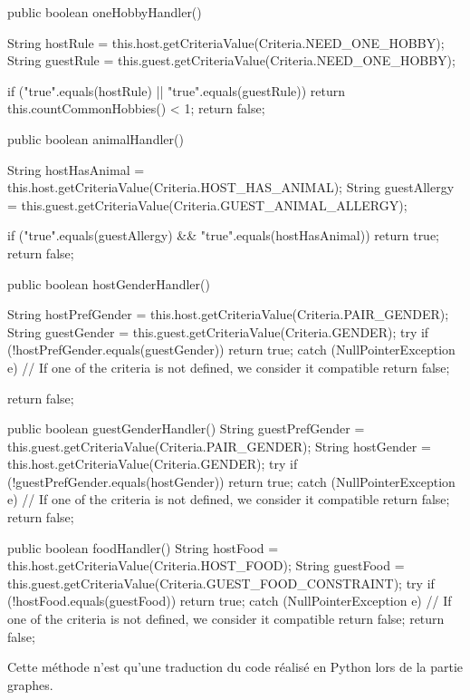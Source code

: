 \documentclass{mytex}
\begin{document}

\begin{codebox}
public boolean oneHobbyHandler() {
	String hostRule = this.host.getCriteriaValue(Criteria.NEED_ONE_HOBBY);
	String guestRule = this.guest.getCriteriaValue(Criteria.NEED_ONE_HOBBY);    
	
	if ("true".equals(hostRule) || "true".equals(guestRule)) {
		return this.countCommonHobbies() < 1;
	}
	return false;
}

public boolean animalHandler() {
	String hostHasAnimal = this.host.getCriteriaValue(Criteria.HOST_HAS_ANIMAL);
	String guestAllergy = this.guest.getCriteriaValue(Criteria.GUEST_ANIMAL_ALLERGY);
	
	if ("true".equals(guestAllergy) && "true".equals(hostHasAnimal)) {
		return true;
	}
	return false;
}

public boolean hostGenderHandler() {
	String hostPrefGender = this.host.getCriteriaValue(Criteria.PAIR_GENDER);
	String guestGender = this.guest.getCriteriaValue(Criteria.GENDER);
	try {
		if (!hostPrefGender.equals(guestGender)) {
			return true;
		}
	} catch (NullPointerException e) {
		// If one of the criteria is not defined, we consider it compatible
		return false;
	}
	
	return false;
}
\end{codebox}

\begin{codebox}
public boolean guestGenderHandler() {
	String guestPrefGender = this.guest.getCriteriaValue(Criteria.PAIR_GENDER);
	String hostGender = this.host.getCriteriaValue(Criteria.GENDER);
	try {
		if (!guestPrefGender.equals(hostGender)) {
			return true;
		}
	} catch (NullPointerException e) {
		// If one of the criteria is not defined, we consider it compatible
		return false;
	}
	return false;
}

public boolean foodHandler() {
	String hostFood = this.host.getCriteriaValue(Criteria.HOST_FOOD);
	String guestFood = this.guest.getCriteriaValue(Criteria.GUEST_FOOD_CONSTRAINT);
	try {
		if (!hostFood.equals(guestFood)) {
			return true;
		}
	} catch (NullPointerException e) {
		// If one of the criteria is not defined, we consider it compatible
		return false;
	}
	return false;
}
\end{codebox}


Cette méthode n'est qu'une traduction du code réalisé en Python lors de la partie graphes.
\end{document}
